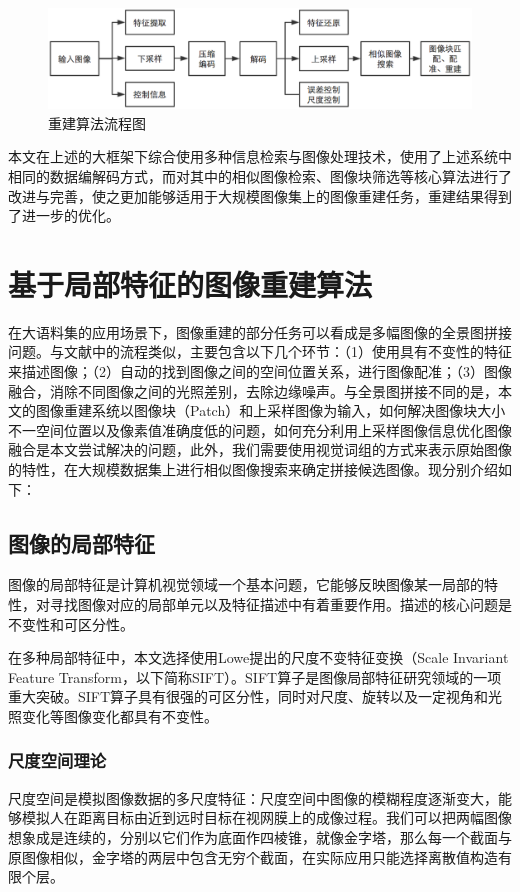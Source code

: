\documentclass[UTF8]{csoarticle}
\begin{document}
\begin{figure}
\centering\includegraphics[width=15cm]{flowchart}
\caption{重建算法流程图}
\label{fig:flow}
\end{figure}

本文在上述的大框架下综合使用多种信息检索与图像处理技术，使用了上述系统中相同的数据编解码方式，而对其中的相似图像检索、图像块筛选等核心算法进行了改进与完善，使之更加能够适用于大规模图像集上的图像重建任务，重建结果得到了进一步的优化。

\section{基于局部特征的图像重建算法}
在大语料集的应用场景下，图像重建的部分任务可以看成是多幅图像的全景图拼接问题。与文献\cite{Brown:2006ir}中的流程类似，主要包含以下几个环节：（1）使用具有不变性的特征来描述图像；（2）自动的找到图像之间的空间位置关系，进行图像配准；（3）图像融合，消除不同图像之间的光照差别，去除边缘噪声。与全景图拼接不同的是，本文的图像重建系统以图像块（Patch）和上采样图像为输入，如何解决图像块大小不一空间位置以及像素值准确度低的问题，如何充分利用上采样图像信息优化图像融合是本文尝试解决的问题，此外，我们需要使用视觉词组的方式来表示原始图像的特性，在大规模数据集上进行相似图像搜索来确定拼接候选图像。现分别介绍如下：

\subsection{图像的局部特征}
图像的局部特征是计算机视觉领域一个基本问题，它能够反映图像某一局部的特性，对寻找图像对应的局部单元以及特征描述中有着重要作用。描述的核心问题是不变性和可区分性。

在多种局部特征中，本文选择使用Lowe提出的尺度不变特征变换（Scale Invariant Feature Transform，以下简称SIFT）。SIFT算子是图像局部特征研究领域的一项重大突破。SIFT算子具有很强的可区分性，同时对尺度、旋转以及一定视角和光照变化等图像变化都具有不变性。

\subsubsection{尺度空间理论}
尺度空间是模拟图像数据的多尺度特征：尺度空间中图像的模糊程度逐渐变大，能够模拟人在距离目标由近到远时目标在视网膜上的成像过程。我们可以把两幅图像想象成是连续的，分别以它们作为底面作四棱锥，就像金字塔，那么每一个截面与原图像相似，金字塔的两层中包含无穷个截面，在实际应用只能选择离散值构造有限个层。
\end{document}
